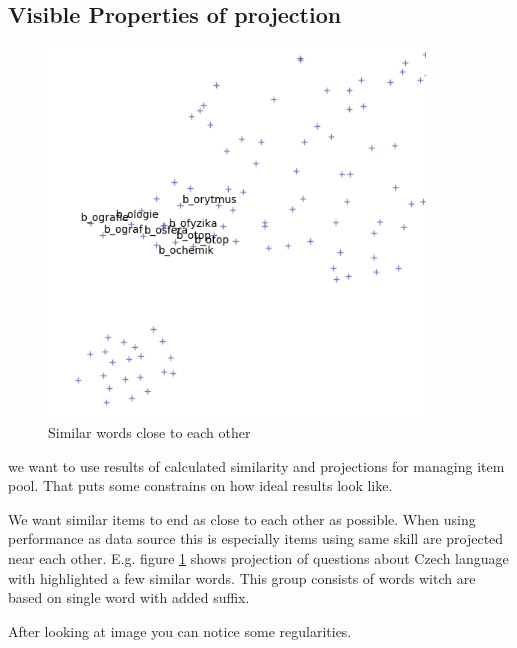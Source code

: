 \documentclass[
  digital, %
  table,   %
  nolof,     %
  nolot,     %
  nocover
]{fithesis3}
\begin{document}
\subsection{Visible Properties of
projection}\label{visible-properties-of-projection}



\begin{figure}
  \begin{center}
    \includegraphics[width=10cm]{img/similar_words}
  \end{center}
  \caption{Similar words close to each other}
  \label{similarwords}
\end{figure}

we want to use results of calculated similarity and projections for
managing item pool. That puts some constrains on how ideal results look
like.

We want similar items to end as close to each other as possible. When
using performance as data source this is especially items using same
skill are projected near each other. E.g. figure \ref{similarwords}
shows projection of questions about Czech language with highlighted a
few similar words. This group consists of words witch are based on
single word with added suffix.



After looking at image you can notice some regularities.
\end{document}
